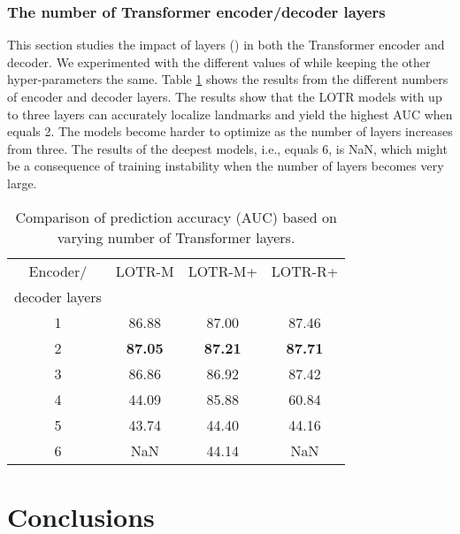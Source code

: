 \documentclass[journal]{IEEEtran}
\begin{document}
\subsubsection{The number of Transformer encoder/decoder layers}\label{subsubsec:ablation_tf_layers}

This section studies the impact of layers () in both the Transformer encoder and decoder.
We experimented with the different values of  while keeping the other hyper-parameters the same.
Table \ref{tab:tf_layer} shows the results from the different numbers of encoder and decoder layers.
The results show that the LOTR models with up to three layers can accurately localize landmarks and yield the highest AUC when  equals 2.
The models become harder to optimize as the number of layers increases from three.
The results of the deepest models, i.e.,  equals 6, is NaN, which might be a consequence of training instability when the number of layers becomes very large.

\begin{table}
\caption{Comparison of prediction accuracy (AUC) based on varying number of Transformer layers.}
\centering
\begin{tabular}{cccc}
\hline
Encoder/       & LOTR-M & LOTR-M+ & LOTR-R+ \\
decoder layers &        &         &         \\
\hline
1              &         86.88  &          87.00   &          87.46   \\
2              & \textbf{87.05} &  \textbf{87.21}  &  \textbf{87.71}   \\
3              &         86.86  &          86.92   &          87.42   \\
4              &         44.09  &          85.88   &          60.84   \\
5              &         43.74  &          44.40   &          44.16   \\
6              &         NaN    &          44.14   &          NaN     \\
\hline
\end{tabular}
\par
\label{tab:tf_layer}
\end{table}



\section{Conclusions}\label{sec:conclusion}
\end{document}
